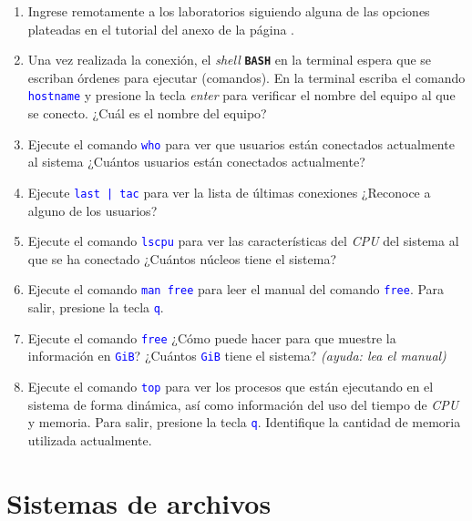 \documentclass[12pt]{article}
\newcommand{\cw}[1]{\texttt{\textcolor{blue}{#1}}}
\newcommand{\bash}{\textbf{\texttt{BASH}}}
\begin{document}
\begin{enumerate}

    \item Ingrese remotamente a los laboratorios siguiendo alguna de las
        opciones plateadas en el tutorial del anexo de la página
        \pageref{sec:anexoConexion}.
        
    \item Una vez realizada la conexión, el \emph{shell} \bash{} en la
        terminal espera que se escriban órdenes para ejecutar (comandos). En
        la terminal escriba el comando \cw{hostname} y presione la tecla
        \emph{enter} para verificar el nombre del equipo al que se conecto.
        ¿Cuál es el nombre del equipo?

    \item Ejecute el comando \cw{who} para ver que usuarios están conectados
        actualmente al sistema ¿Cuántos usuarios están conectados actualmente?

    \item Ejecute \cw{last | tac} para ver la lista de últimas conexiones
        ¿Reconoce a alguno de los usuarios?

    \item Ejecute el comando \cw{lscpu} para ver las características del
        \emph{CPU} del sistema al que se ha conectado ¿Cuántos núcleos tiene
        el sistema?

    \item Ejecute el comando \cw{man free} para leer el manual del comando
        \cw{free}. Para salir, presione la tecla \cw{q}.

    \item Ejecute el comando \cw{free} ¿Cómo puede hacer para que muestre la
        información en \cw{GiB}? ¿Cuántos \cw{GiB} tiene el sistema?
        \emph{(ayuda: lea el manual)}

    \item Ejecute el comando \cw{top} para ver los procesos que están
        ejecutando en el sistema de forma dinámica, así como información del
        uso del tiempo de \emph{CPU} y memoria. Para salir, presione la tecla
        \cw{q}. Identifique la cantidad de memoria utilizada actualmente.

\end{enumerate}

\section{Sistemas de archivos}
\end{document}
